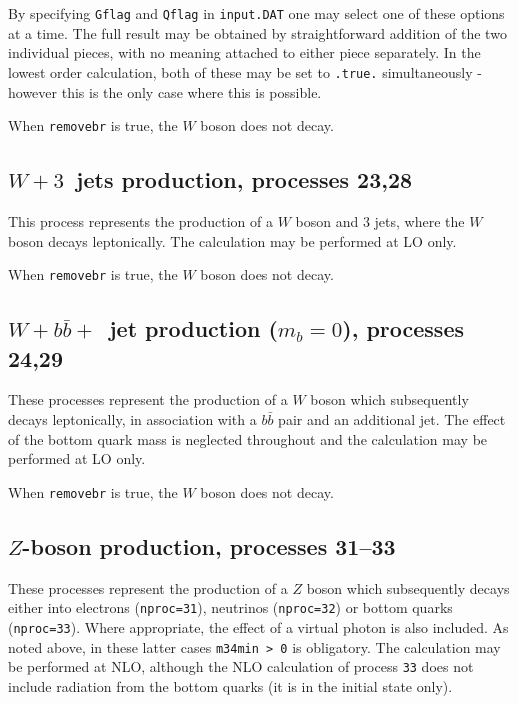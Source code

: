 \documentclass[12pt]{article}
\begin{document}
By specifying {\tt Gflag} and {\tt Qflag} in {\tt input.DAT} one may
select one of these options at a time. The full result may be obtained
by straightforward addition of the two individual pieces, with no
meaning attached to either piece separately. In the lowest order calculation,
both of these may be set to {\tt .true.} simultaneously - however this is
the only case where this is possible.

When {\tt removebr} is true, the $W$ boson does not decay.

\subsection{$W+3$~jets production, processes 23,28}
\label{subsec:w3jets}

This process represents the production of a $W$ boson and $3$ jets,
where the $W$ boson decays leptonically. The calculation may be
performed at LO only.

When {\tt removebr} is true, the $W$ boson does not decay.

\subsection{$W+b{\bar b}+$~jet production ($m_b=0$), processes 24,29}
\label{subsec:wbbjetmassless}

These processes represent the production of a $W$ boson which subsequently
decays leptonically, in association with a $b{\bar b}$ pair and an
additional jet. The effect of the bottom quark mass is neglected throughout
and the calculation may be performed at LO only.

When {\tt removebr} is true, the $W$ boson does not decay.

\subsection{$Z$-boson production, processes 31--33}
\label{subsec:zboson}

These processes represent the production of a $Z$ boson which subsequently
decays either into electrons ({\tt nproc=31}), neutrinos ({\tt nproc=32})
or bottom quarks ({\tt nproc=33}). Where appropriate, the effect of a virtual
photon is also included. As noted above, in these latter cases {\tt m34min > 0}
is obligatory. The calculation may be performed at NLO,
although the NLO calculation of process {\tt 33} does not include radiation
from the bottom quarks (it is in the initial state only).
\end{document}

